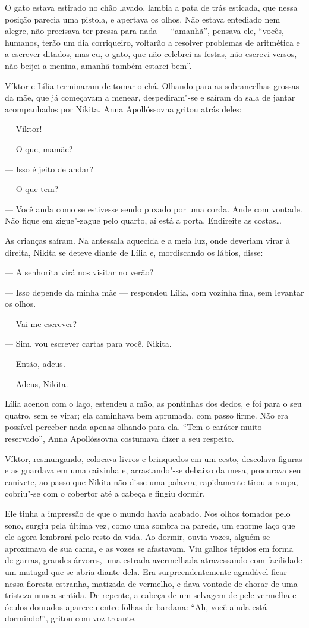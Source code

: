 O gato estava estirado no chão lavado, lambia a pata de trás esticada,
que nessa posição parecia uma pistola, e apertava os olhos. Não estava
entediado nem alegre, não precisava ter pressa para nada --- ``amanhã'',
pensava ele, ``vocês, humanos, terão um dia corriqueiro, voltarão a
resolver problemas de aritmética e a escrever ditados, mas eu, o gato,
que não celebrei as festas, não escrevi versos, não beijei a menina,
amanhã também estarei bem''.

Víktor e Lília terminaram de tomar o chá. Olhando para as sobrancelhas
grossas da mãe, que já começavam a menear, despediram"-se e saíram da
sala de jantar acompanhados por Nikita. Anna Apollóssovna gritou atrás
deles:

--- Víktor!

--- O que, mamãe?

--- Isso é jeito de andar?

--- O que tem?

--- Você anda como se estivesse sendo puxado por uma corda. Ande com
vontade. Não fique em zigue"-zague pelo quarto, aí está a porta.
Endireite as costas\ldots{}

As crianças saíram. Na antessala aquecida e a meia luz, onde deveriam
virar à direita, Nikita se deteve diante de Lília e, mordiscando os
lábios, disse:

--- A senhorita virá nos visitar no verão?

--- Isso depende da minha mãe --- respondeu Lília, com vozinha fina, sem
levantar os olhos.

--- Vai me escrever?

--- Sim, vou escrever cartas para você, Nikita.

--- Então, adeus.

--- Adeus, Nikita.

Lília acenou com o laço, estendeu a mão, as pontinhas dos dedos, e foi
para o seu quatro, sem se virar; ela caminhava bem aprumada, com passo
firme. Não era possível perceber nada apenas olhando para ela. ``Tem o
caráter muito reservado'', Anna Apollóssovna costumava dizer a seu
respeito.

Víktor, resmungando, colocava livros e brinquedos em um cesto, descolava
figuras e as guardava em uma caixinha e, arrastando"-se debaixo da mesa,
procurava seu canivete, ao passo que Nikita não disse uma palavra;
rapidamente tirou a roupa, cobriu"-se com o cobertor até a cabeça e
fingiu dormir.

Ele tinha a impressão de que o mundo havia acabado. Nos olhos tomados
pelo sono, surgiu pela última vez, como uma sombra na parede, um enorme
laço que ele agora lembrará pelo resto da vida. Ao dormir, ouvia vozes,
alguém se aproximava de sua cama, e as vozes se afastavam. Viu galhos
tépidos em forma de garras, grandes árvores, uma estrada avermelhada
atravessando com facilidade um matagal que se abria diante dela. Era
surpreendentemente agradável ficar nessa floresta estranha, matizada de
vermelho, e dava vontade de chorar de uma tristeza nunca sentida. De
repente, a cabeça de um selvagem de pele vermelha e óculos dourados
apareceu entre folhas de bardana: ``Ah, você ainda está dormindo!'',
gritou com voz troante.

